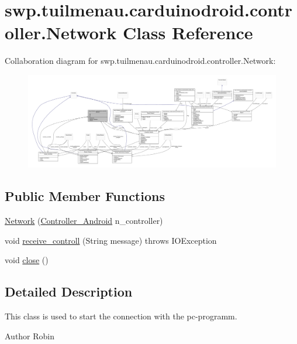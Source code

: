 \hypertarget{classswp_1_1tuilmenau_1_1carduinodroid_1_1controller_1_1_network}{}\section{swp.\+tuilmenau.\+carduinodroid.\+controller.\+Network Class Reference}
\label{classswp_1_1tuilmenau_1_1carduinodroid_1_1controller_1_1_network}


Collaboration diagram for swp.\+tuilmenau.\+carduinodroid.\+controller.\+Network\+:
\nopagebreak
\begin{figure}[H]
\begin{center}
\leavevmode
\includegraphics[width=350pt]{classswp_1_1tuilmenau_1_1carduinodroid_1_1controller_1_1_network__coll__graph}
\end{center}
\end{figure}
\subsection*{Public Member Functions}
\begin{DoxyCompactItemize}
\item 
\hyperlink{classswp_1_1tuilmenau_1_1carduinodroid_1_1controller_1_1_network_ab8d4c3dc6072ba6e6d96d0fd6c1b76e2}{Network} (\hyperlink{classswp_1_1tuilmenau_1_1carduinodroid_1_1controller_1_1_controller___android}{Controller\+\_\+\+Android} n\+\_\+controller)
\item 
void \hyperlink{classswp_1_1tuilmenau_1_1carduinodroid_1_1controller_1_1_network_a3bdf599c2a8dfadbe3b2d8e7c00b8ab0}{receive\+\_\+controll} (String message)  throws I\+O\+Exception 
\item 
void \hyperlink{classswp_1_1tuilmenau_1_1carduinodroid_1_1controller_1_1_network_a310032de4956f12176e2ab75d9d34851}{close} ()
\end{DoxyCompactItemize}


\subsection{Detailed Description}
This class is used to start the connection with the pc-\/programm. \begin{DoxyAuthor}{Author}
Robin 
\end{DoxyAuthor}


